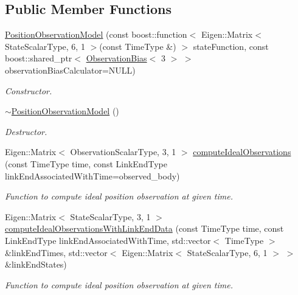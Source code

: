 \subsection*{Public Member Functions}
\begin{DoxyCompactItemize}
\item 
\hyperlink{classtudat_1_1observation__models_1_1PositionObservationModel_acaf9d4df7091073b5234b099358afad8}{Position\+Observation\+Model} (const boost\+::function$<$ Eigen\+::\+Matrix$<$ State\+Scalar\+Type, 6, 1 $>$(const Time\+Type \&) $>$ state\+Function, const boost\+::shared\+\_\+ptr$<$ \hyperlink{classtudat_1_1observation__models_1_1ObservationBias}{Observation\+Bias}$<$ 3 $>$ $>$ observation\+Bias\+Calculator=N\+U\+LL)
\begin{DoxyCompactList}\small\item\em Constructor. \end{DoxyCompactList}\item 
\hyperlink{classtudat_1_1observation__models_1_1PositionObservationModel_a45cde15f6e1d5ee638b8e5e16eff7f1f}{$\sim$\+Position\+Observation\+Model} ()\hypertarget{classtudat_1_1observation__models_1_1PositionObservationModel_a45cde15f6e1d5ee638b8e5e16eff7f1f}{}\label{classtudat_1_1observation__models_1_1PositionObservationModel_a45cde15f6e1d5ee638b8e5e16eff7f1f}

\begin{DoxyCompactList}\small\item\em Destructor. \end{DoxyCompactList}\item 
Eigen\+::\+Matrix$<$ Observation\+Scalar\+Type, 3, 1 $>$ \hyperlink{classtudat_1_1observation__models_1_1PositionObservationModel_af5cb758c7a81aeac27e89e4c933838ea}{compute\+Ideal\+Observations} (const Time\+Type time, const Link\+End\+Type link\+End\+Associated\+With\+Time=observed\+\_\+body)
\begin{DoxyCompactList}\small\item\em Function to compute ideal position observation at given time. \end{DoxyCompactList}\item 
Eigen\+::\+Matrix$<$ State\+Scalar\+Type, 3, 1 $>$ \hyperlink{classtudat_1_1observation__models_1_1PositionObservationModel_ac0d1c09733ce49796321973755908173}{compute\+Ideal\+Observations\+With\+Link\+End\+Data} (const Time\+Type time, const Link\+End\+Type link\+End\+Associated\+With\+Time, std\+::vector$<$ Time\+Type $>$ \&link\+End\+Times, std\+::vector$<$ Eigen\+::\+Matrix$<$ State\+Scalar\+Type, 6, 1 $>$ $>$ \&link\+End\+States)
\begin{DoxyCompactList}\small\item\em Function to compute ideal position observation at given time. \end{DoxyCompactList}\end{DoxyCompactItemize}
